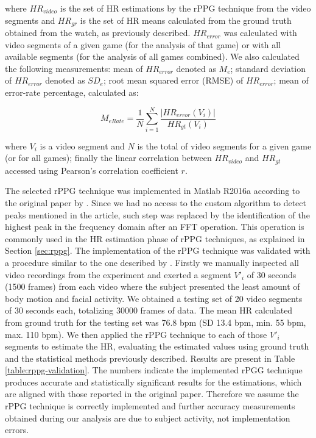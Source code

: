 where $HR_{video}$ is the set of HR estimations by the rPPG technique from the video segments and $HR_{gr}$ is the set of HR means calculated from the ground truth obtained from the watch, as previously described. $HR_{error}$ was calculated with video segments of a given game (for the analysis of that game) or with all available segments (for the analysis of all games combined). We also calculated the following measurements: mean of $HR_{error}$ denoted as $M_e$; standard deviation of $HR_{error}$ denoted as $SD_e$; root mean squared error (RMSE) of $HR_{error}$; mean of error-rate percentage, calculated as:

\begin{equation}
\label{eqn:merate}
M_{eRate} = \frac{1}{N} \sum_{i=1}^{N}\frac{|HR_{error}(V_i)|}{HR_{gt}(V_i)}
\end{equation}

where $V_i$ is a video segment and $N$ is the total of video segments for a given game (or for all games); finally the linear correlation between $HR_{video}$ and $HR_{gt}$ accessed using Pearson's correlation coefficient $r$.


The selected rPPG technique was implemented in Matlab R2016a according to the original paper by \textcite{poh2011advancements}. Since we had no access to the custom algorithm to detect peaks mentioned in the article, such step was replaced by the identification of the highest peak in the frequency domain after an FFT operation. This operation is commonly used in the HR estimation phase of rPPG techniques, as explained in Section \ref{sec:rppg}.
The implementation of the rPPG technique was validated with a procedure similar to the one described by \textcite{li2014remote}. Firstly we manually inspected all video recordings from the experiment and exerted a segment $V'_i$ of 30 seconds (1500 frames) from each video where the subject presented the least amount of body motion and facial activity. We obtained a testing set of 20 video segments of 30 seconds each, totalizing 30000 frames of data. The mean HR calculated from ground truth for the testing set was 76.8 bpm (SD 13.4 bpm, min. 55 bpm, max. 110 bpm). We then applied the rPPG technique to each of those $V'_i$ segments to estimate the HR, evaluating the estimated values using ground truth and the statistical methods previously described. Results are present in Table \ref{table:rppg-validation}. The numbers indicate the implemented rPGG technique produces accurate and statistically significant results for the estimations, which are aligned with those reported in the original paper. Therefore we assume the rPPG technique is correctly implemented and further accuracy measurements obtained during our analysis are due to subject activity, not implementation errors.

